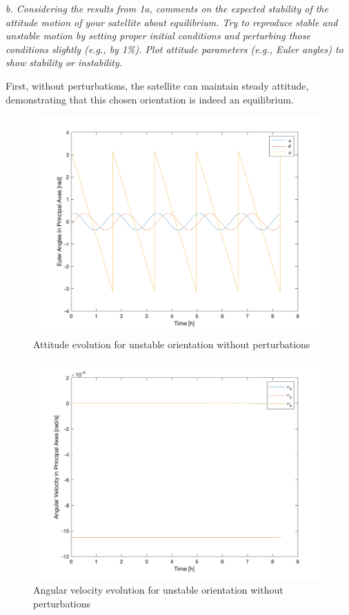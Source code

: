 \textit{b. Considering the results from 1a, comments on the expected stability of the attitude motion of your satellite about equilibrium. Try to reproduce stable and unstable motion by setting proper initial conditions and perturbing those conditions slightly (e.g., by 1\%). Plot attitude parameters (e.g., Euler angles) to show stability or instability.}

First, without perturbations, the satellite can maintain steady attitude, demonstrating that this chosen orientation is indeed an equilibrium.

\begin{figure}[H]
\centering
\includegraphics[scale=0.6]{Images/ps5_problem1b_angle_unperturbed.png}
\caption{Attitude evolution for unstable orientation without perturbations}
\label{fig:ps5_problem1b_angle_unperturbed}
\end{figure}

\begin{figure}[H]
\centering
\includegraphics[scale=0.6]{Images/ps5_problem1b_angvel_unperturbed.png}
\caption{Angular velocity evolution for unstable orientation without perturbations}
\label{fig:ps5_problem1b_angvel_unperturbed}
\end{figure}

